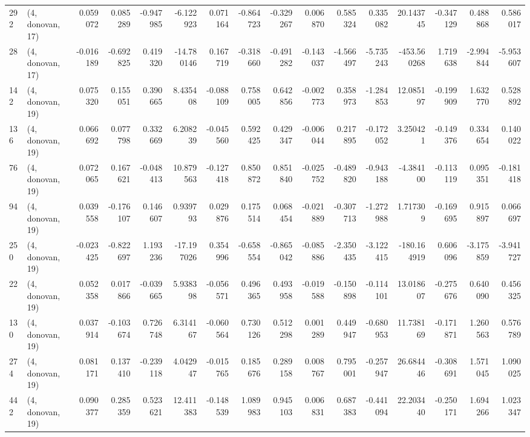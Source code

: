\begin{tabular}{llrrrrrrrrrrrrrr}
292 &  (4, donovan, 17) &   0.059072 &  0.085289 & -0.947985 &   -6.122923 &  0.071164 &  -0.864723 & -0.329267 &  0.006870 &  0.585324 &  0.335082 &   20.143745 & -0.347129 &  0.488868 &  0.586017 \\
28  &  (4, donovan, 17) &  -0.016189 & -0.692825 &  0.419320 &  -14.780146 &  0.167719 &  -0.318660 & -0.491282 & -0.143037 & -4.566497 & -5.735243 & -453.560268 &  1.719638 & -2.994844 & -5.953607 \\
142 &  (4, donovan, 19) &   0.075320 &  0.155051 &  0.390665 &    8.435408 & -0.088109 &   0.758005 &  0.642856 & -0.002773 &  0.358973 & -1.284853 &   12.085197 & -0.199909 &  1.632770 &  0.528892 \\
136 &  (4, donovan, 19) &   0.066692 &  0.077798 &  0.332669 &    6.208239 & -0.045560 &   0.592425 &  0.429347 & -0.006044 &  0.217895 & -0.172052 &    3.250421 & -0.149376 &  0.334654 &  0.140022 \\
76  &  (4, donovan, 19) &   0.072065 &  0.167621 & -0.048413 &   10.879563 & -0.127418 &   0.850872 &  0.851840 & -0.025752 & -0.489820 & -0.943188 &   -4.384100 & -0.113119 &  0.095351 & -0.181418 \\
94  &  (4, donovan, 19) &   0.039558 & -0.176107 &  0.146607 &    0.939793 &  0.029876 &   0.175514 &  0.068454 & -0.021889 & -0.307713 & -1.272988 &    1.717309 & -0.169695 &  0.915897 &  0.066697 \\
250 &  (4, donovan, 19) &  -0.023425 & -0.822697 &  1.193236 &  -17.197026 &  0.354996 &  -0.658554 & -0.865042 & -0.085886 & -2.350435 & -3.122415 & -180.164919 &  0.606096 & -3.175859 & -3.941727 \\
22  &  (4, donovan, 19) &   0.052358 &  0.017866 & -0.039665 &    5.938398 & -0.056571 &   0.496365 &  0.493958 & -0.019588 & -0.150898 & -0.114101 &   13.018607 & -0.275676 &  0.640090 &  0.456325 \\
130 &  (4, donovan, 19) &   0.037914 & -0.103674 &  0.726748 &    6.314167 & -0.060564 &   0.730126 &  0.512298 &  0.001289 &  0.449947 & -0.680953 &   11.738169 & -0.171871 &  1.260563 &  0.576789 \\
274 &  (4, donovan, 19) &   0.081171 &  0.137410 & -0.239118 &    4.042947 & -0.015765 &   0.185676 &  0.289158 &  0.008767 &  0.795001 & -0.257947 &   26.684446 & -0.308691 &  1.571045 &  1.090025 \\
442 &  (4, donovan, 19) &   0.090377 &  0.285359 &  0.523621 &   12.411383 & -0.148539 &   1.089983 &  0.945103 &  0.006831 &  0.687383 & -0.441094 &   22.203440 & -0.250171 &  1.694266 &  1.023347 \\

\end{tabular}
